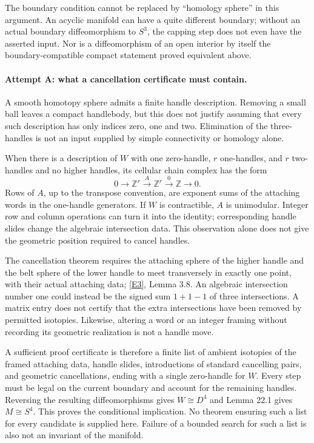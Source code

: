 \documentclass[11pt]{article}
\begin{document}
The boundary condition cannot be replaced by ``homology sphere'' in
this argument. An acyclic manifold can have a quite different boundary;
without an actual boundary diffeomorphism to $S^3$, the capping step
does not even have the asserted input. Nor is a diffeomorphism of an
open interior by itself the boundary-compatible compact statement
proved equivalent above.

\paragraph{Attempt A: what a cancellation certificate must contain.}
A smooth homotopy sphere admits a finite handle description. Removing
a small ball leaves a compact handlebody, but this does not justify
assuming that every such description has only indices zero, one and
two. Elimination of the three-handles is not an input supplied by
simple connectivity or homology alone.

When there is a description of $W$ with one zero-handle, $r$ one-handles,
and $r$ two-handles and no higher handles, its cellular chain complex
has the form
\[
 0\longrightarrow\mathbb Z^r
      \xrightarrow{A}\mathbb Z^r
      \xrightarrow{0}\mathbb Z\longrightarrow0.
\]
Rows of $A$, up to the transpose convention, are exponent sums of the
attaching words in the one-handle generators. If $W$ is contractible,
$A$ is unimodular. Integer row and column operations can turn it into
the identity; corresponding handle slides change the algebraic
intersection data. This observation alone does not give the geometric
position required to cancel handles.

The cancellation theorem requires the attaching sphere of the higher
handle and the belt sphere of the lower handle to meet transversely
in exactly one point, with their actual attaching data; \href{https://www.maths.gla.ac.uk/~mpowell/surgery-notes.pdf}{[E3]}, Lemma 3.8.
An algebraic intersection number one could instead be the signed sum
$1+1-1$ of three intersections. A matrix entry does not certify that
the extra intersections have been removed by permitted isotopies.
Likewise, altering a word or an integer framing without recording its
geometric realization is not a handle move.

A sufficient proof certificate is therefore a finite list of ambient
isotopies of the framed attaching data, handle slides, introductions of
standard cancelling pairs, and geometric cancellations, ending with a
single zero-handle for $W$. Every step must be legal on the current
boundary and account for the remaining handles. Reversing the resulting
diffeomorphisms gives $W\cong D^4$ and Lemma 22.1 gives $M\cong S^4$.
This proves the conditional implication. No theorem ensuring such a
list for every candidate is supplied here. Failure of a bounded search
for such a list is also not an invariant of the manifold.
\end{document}
